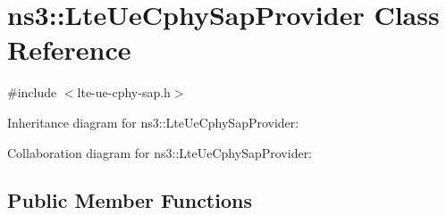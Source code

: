 \hypertarget{classns3_1_1LteUeCphySapProvider}{}\section{ns3\+:\+:Lte\+Ue\+Cphy\+Sap\+Provider Class Reference}
\label{classns3_1_1LteUeCphySapProvider}


{\ttfamily \#include $<$lte-\/ue-\/cphy-\/sap.\+h$>$}



Inheritance diagram for ns3\+:\+:Lte\+Ue\+Cphy\+Sap\+Provider\+:


Collaboration diagram for ns3\+:\+:Lte\+Ue\+Cphy\+Sap\+Provider\+:
\subsection*{Public Member Functions}
